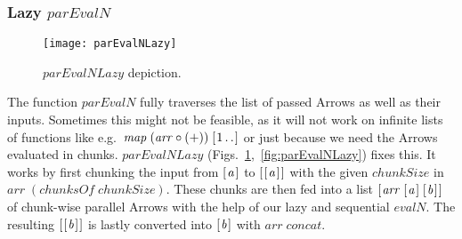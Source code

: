 \documentclass{jfp1}
\newcommand{\Varid}[1]{\mathit{#1}}
\DeclareRobustCommand{\hairspn}{\hspace{1pt}\nolinebreak}%
\DeclareRobustCommand{\eg}{{e.\hairspn{}g.~}}
\begin{document}
\subsubsection{Lazy \ensuremath{\Varid{parEvalN}}}
\begin{figure}[tb]
	\texttt{[image: parEvalNLazy]}
	\caption{\ensuremath{\Varid{parEvalNLazy}} depiction.}
	\label{fig:parEvalNLazyImg}
\end{figure}
The function \ensuremath{\Varid{parEvalN}} fully traverses the list of passed Arrows as well as their inputs. Sometimes this might not be feasible, as it will not work on infinite lists of functions like \eg \ensuremath{\Varid{map}\;(\Varid{arr}\mathbin{\circ}(\mathbin{+}))\;[\mskip1.5mu \mathrm{1}\mathinner{\ldotp\ldotp}\mskip1.5mu]} or just because we need the Arrows evaluated in chunks. \ensuremath{\Varid{parEvalNLazy}} (Figs.~\ref{fig:parEvalNLazyImg},~\ref{fig:parEvalNLazy}) fixes this. It works by first chunking the input from \ensuremath{[\mskip1.5mu \Varid{a}\mskip1.5mu]} to \ensuremath{[\mskip1.5mu [\mskip1.5mu \Varid{a}\mskip1.5mu]\mskip1.5mu]} with the given \ensuremath{\Varid{chunkSize}} in \ensuremath{\Varid{arr}\;(\Varid{chunksOf}\;\Varid{chunkSize})}. These chunks are then fed into a list \ensuremath{[\mskip1.5mu \Varid{arr}\;[\mskip1.5mu \Varid{a}\mskip1.5mu]\;[\mskip1.5mu \Varid{b}\mskip1.5mu]\mskip1.5mu]} of chunk-wise parallel Arrows with the help of our lazy and sequential \ensuremath{\Varid{evalN}}. The resulting \ensuremath{[\mskip1.5mu [\mskip1.5mu \Varid{b}\mskip1.5mu]\mskip1.5mu]} is lastly converted into \ensuremath{[\mskip1.5mu \Varid{b}\mskip1.5mu]} with \ensuremath{\Varid{arr}\;\Varid{concat}}.
\end{document}
